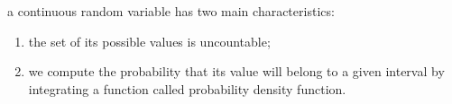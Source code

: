 \documentclass[a4paper,12pt]{article}
\newcommand{\?}{\stackrel{?}{=}}
\begin{document}
\newenvironment{note}
  {\begin{bclogo}[logo=\bcinfo, couleurBarre=orange, couleur=lightgray]{ note}}
  {\end{bclogo}}
\newenvironment{attention}
  {\begin{bclogo}[logo=\bcattention, couleurBarre=red, noborder=true, 
                couleur=red!15]{Important!}}
  {\end{bclogo}}

a continuous random variable has two main characteristics:\\[0pt]
\begin{enumerate}
\item the set of its possible values is uncountable;\\[0pt]
\item we compute the probability that its value will belong to a given interval by integrating a function called probability density function.
\end{enumerate}
\end{document}
